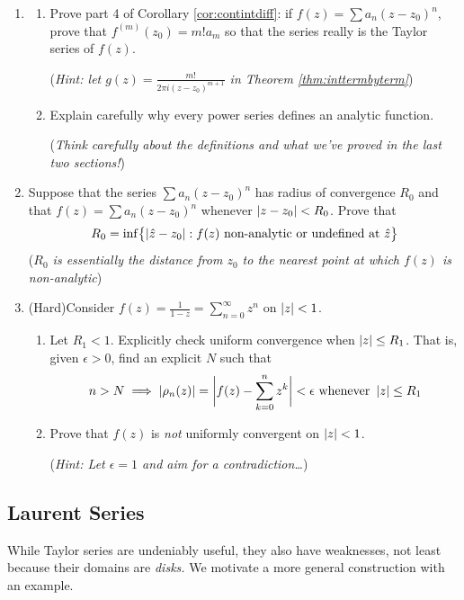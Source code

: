 \begin{exercises}
\begin{enumerate}
		
		\item\label{ex:uniquetaylor}\begin{enumerate}
		  \item Prove part 4 of Corollary \ref{cor:contintdiff}: if $f(z)= \sum a_n(z-z_0)^n$, prove that $f^{(m)}(z_0)=m!a_m$ so that the series really is the Taylor series of $f(z)$.\par
			(\emph{Hint: let $g(z) =\frac{m!}{2\pi i(z-z_0)^{m+1}}$ in Theorem \ref{thm:inttermbyterm}})
			\item Explain carefully why every power series defines an analytic function.\par
	  (\emph{Think carefully about the definitions and what we've proved in the last two sections!})
		\end{enumerate}
		
		
		\item\label{exs:raddistnonanalytic} Suppose that the series $\sum a_n(z-z_0)^n$ has radius of convergence $R_0$ and that $f(z)=\sum a_n(z-z_0)^n$ whenever $\left| z-z_0\right|<R_0$. Prove that
		\[
			R_0=\inf\bigl\{\left| \hat z-z_0\right|:f(z)\text{ non-analytic or undefined at $\hat z$}\bigr\}
		\]
		(\emph{$R_0$ is essentially the distance from $z_0$ to the nearest point at which $f(z)$ is non-analytic})
		
		
		\item\label{ex:notuniform} (Hard)\lstsp Consider $f(z)=\frac 1{1-z}=\sum\limits_{n=0}^\infty z^n$ on $\left| z\right|<1$.
		\begin{enumerate}
		  \item Let $R_1<1$. Explicitly check uniform convergence when $\left| z\right|\le R_1$. That is, given $\epsilon>0$, find an explicit $N$ such that
		  \[
		  	n>N\implies \left| \rho_n(z)\right|=\biggl|f(z)-\sum_{k=0}^nz^k\biggr|<\epsilon\text{ whenever }\left| z\right|\le R_1
		  \]
		  \item Prove that $f(z)$ is \emph{not} uniformly convergent on $\left| z\right|<1$.\par
		  (\emph{Hint: Let $\epsilon=1$ and aim for a contradiction\ldots})
		\end{enumerate}
	\end{enumerate}
\end{exercises}


\clearpage


\subsection{Laurent Series}

While Taylor series are undeniably useful, they also have weaknesses, not least because their domains are \emph{disks.} We motivate a more general construction with an example.

